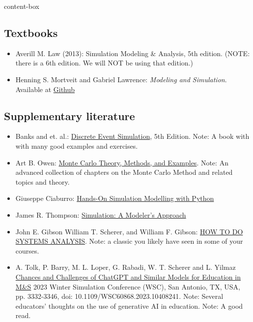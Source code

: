 \documentclass[11pt, a4paper]{article}
\begin{document}
\begin{BlockClass}{content-box}

\subsection*{Textbooks}
\begin{itemize}
\item Averill M. Law (2013): Simulation Modeling \& Analysis, 5th edition. (NOTE: there is a 6th edition. We will NOT be using that edition.)

\item Henning S. Mortveit and Gabriel Lawrence: \textit{Modeling and Simulation}. Available at \href{https://gabriel-vzh2vs.github.io/Modelling-And-Simulation-Public-Release/}{Github}
\end{itemize}

\subsection*{Supplementary literature}
\begin{itemize}
\item  Banks and et. al.: \href{https://ferltz.github.io/inv_oper_2/documents/books/Discrete-Event%20System%20Simulation-Pearson%20Banks%20Carson%20(2013).pdf}{Discrete Event Simulation}, 5th Edition. Note: A book with with many good examples and exercises.

\item Art B. Owen: \href{https://artowen.su.domains/mc/}{Monte Carlo Theory, Methods, and Examples}. Note: An advanced collection of chapters on the Monte Carlo Method and related topics and theory. 

\item  Giuseppe Ciaburro: \href{https://learning.oreilly.com/library/view/hands-on-simulation-modeling/9781804616888/"}{Hands-On Simulation Modelling with Python} 

\item James R. Thompson: \href{https://onlinelibrary.wiley.com/doi/epdf/10.1002/9780470317068}{Simulation: A Modeler's Approach} 

\item John E. Gibson William T. Scherer, and William F. Gibson: \href{https://onlinelibrary.wiley.com/doi/epdf/10.1002/9780470130599}{HOW TO DO SYSTEMS ANALYSIS}. Note: a classic you likely have seen in some of your courses.

\item A. Tolk, P. Barry, M. L. Loper, G. Rabadi, W. T. Scherer and L. Yilmaz \href{https://ieeexplore.ieee.org/abstract/document/10408241}{Chances and Challenges of ChatGPT and Similar Models for Education in M\&S} 2023 Winter Simulation Conference (WSC), San Antonio, TX, USA, pp. 3332-3346, doi: 10.1109/WSC60868.2023.10408241. Note: Several educators' thoughts on the use of generative AI in education. Note: A good read.
\end{itemize}
\end{BlockClass}
\end{document}

